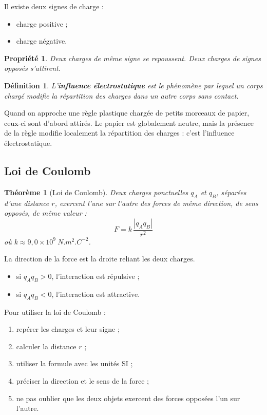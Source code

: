 \documentclass[11pt,a4paper]{article}
\newtheorem{definition}{Définition}[section]
\newtheorem{propriete}{Propriété}[section]
\newtheorem{theoreme}{Théorème}[section]
\begin{document}
Il existe deux signes de charge :
\begin{itemize}
    \item charge positive ;
    \item charge négative.
\end{itemize}

\begin{propriete}
Deux charges de même signe se repoussent.  
Deux charges de signes opposés s'attirent.
\end{propriete}

\begin{definition}
L'\textbf{influence électrostatique} est le phénomène par lequel un corps chargé modifie la répartition des charges dans un autre corps sans contact.
\end{definition}

\begin{applicationbox}
Quand on approche une règle plastique chargée de petits morceaux de papier, ceux-ci sont d'abord attirés.  
Le papier est globalement neutre, mais la présence de la règle modifie localement la répartition des charges : c'est l'influence électrostatique.
\end{applicationbox}

\subsection{Loi de Coulomb}

\begin{theoreme}[Loi de Coulomb]
Deux charges ponctuelles $q_A$ et $q_B$, séparées d'une distance $r$, exercent l'une sur l'autre des forces de même direction, de sens opposés, de même valeur :
\[
F = k\,\frac{|q_A q_B|}{r^2}
\]
où $k \approx 9,0\times 10^9\ \si{N.m^2.C^{-2}}$.
\end{theoreme}

La direction de la force est la droite reliant les deux charges.

\begin{itemize}
    \item si $q_A q_B >0$, l'interaction est répulsive ;
    \item si $q_A q_B <0$, l'interaction est attractive.
\end{itemize}

\begin{methodebox}
Pour utiliser la loi de Coulomb :
\begin{enumerate}
    \item repérer les charges et leur signe ;
    \item calculer la distance $r$ ;
    \item utiliser la formule avec les unités SI ;
    \item préciser la direction et le sens de la force ;
    \item ne pas oublier que les deux objets exercent des forces opposées l'un sur l'autre.
\end{enumerate}
\end{methodebox}
\end{document}
